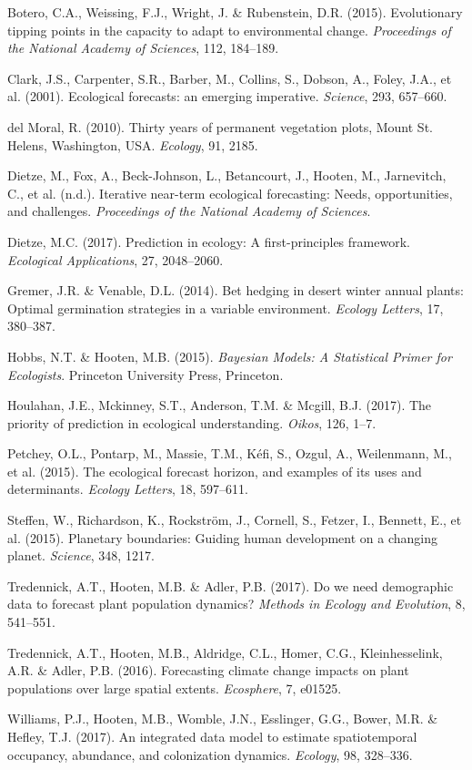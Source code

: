 \documentclass[12pt,]{article}
\begin{document}
\hypertarget{ref-Botero2015}{}
Botero, C.A., Weissing, F.J., Wright, J. \& Rubenstein, D.R. (2015).
Evolutionary tipping points in the capacity to adapt to environmental
change. \emph{Proceedings of the National Academy of Sciences}, 112,
184--189.

\hypertarget{ref-Clark2001}{}
Clark, J.S., Carpenter, S.R., Barber, M., Collins, S., Dobson, A.,
Foley, J.A., et al. (2001). Ecological forecasts: an emerging
imperative. \emph{Science}, 293, 657--660.

\hypertarget{ref-DelMoral2010}{}
{del Moral}, R. (2010). Thirty years of permanent vegetation plots,
Mount St. Helens, Washington, USA. \emph{Ecology}, 91, 2185.

\hypertarget{ref-Dietze2018}{}
Dietze, M., Fox, A., Beck-Johnson, L., Betancourt, J., Hooten, M.,
Jarnevitch, C., et al. (n.d.). Iterative near-term ecological
forecasting: Needs, opportunities, and challenges. \emph{Proceedings of
the National Academy of Sciences}.

\hypertarget{ref-Dietze2017a}{}
Dietze, M.C. (2017). Prediction in ecology: A first-principles
framework. \emph{Ecological Applications}, 27, 2048--2060.

\hypertarget{ref-Gremer2014}{}
Gremer, J.R. \& Venable, D.L. (2014). Bet hedging in desert winter
annual plants: Optimal germination strategies in a variable environment.
\emph{Ecology Letters}, 17, 380--387.

\hypertarget{ref-Hobbs2015}{}
Hobbs, N.T. \& Hooten, M.B. (2015). \emph{Bayesian Models: A Statistical
Primer for Ecologists}. Princeton University Press, Princeton.

\hypertarget{ref-Houlahan2017}{}
Houlahan, J.E., Mckinney, S.T., Anderson, T.M. \& Mcgill, B.J. (2017).
The priority of prediction in ecological understanding. \emph{Oikos},
126, 1--7.

\hypertarget{ref-Petchey2015}{}
Petchey, O.L., Pontarp, M., Massie, T.M., Kéfi, S., Ozgul, A.,
Weilenmann, M., et al. (2015). The ecological forecast horizon, and
examples of its uses and determinants. \emph{Ecology Letters}, 18,
597--611.

\hypertarget{ref-Steffen2015}{}
Steffen, W., Richardson, K., Rockström, J., Cornell, S., Fetzer, I.,
Bennett, E., et al. (2015). Planetary boundaries: Guiding human
development on a changing planet. \emph{Science}, 348, 1217.

\hypertarget{ref-Tredennick2017a}{}
Tredennick, A.T., Hooten, M.B. \& Adler, P.B. (2017). Do we need
demographic data to forecast plant population dynamics? \emph{Methods in
Ecology and Evolution}, 8, 541--551.

\hypertarget{ref-Tredennick2016Ecos}{}
Tredennick, A.T., Hooten, M.B., Aldridge, C.L., Homer, C.G.,
Kleinhesselink, A.R. \& Adler, P.B. (2016). Forecasting climate change
impacts on plant populations over large spatial extents.
\emph{Ecosphere}, 7, e01525.

\hypertarget{ref-Williams2017a}{}
Williams, P.J., Hooten, M.B., Womble, J.N., Esslinger, G.G., Bower, M.R.
\& Hefley, T.J. (2017). An integrated data model to estimate
spatiotemporal occupancy, abundance, and colonization dynamics.
\emph{Ecology}, 98, 328--336.
\end{document}
